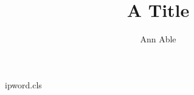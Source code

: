 \begin{filecontents*}[overwrite]{ipword.cls}
\def\and{\unskip\ und\ \ignorespaces}
\newcommand\address[1]{\par{\small\begin{tabular}[t]{c}#1\end{tabular}}\par}
\end{filecontents*}
\documentclass{ipword}

\title{A Title}
\author{Ann Able}
\address{Univ A, Town \and Univ B, City}
\maketitle
Body.

